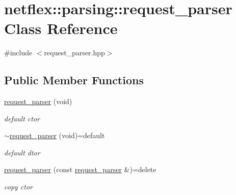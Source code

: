 \hypertarget{classnetflex_1_1parsing_1_1request__parser}{}\section{netflex\+:\+:parsing\+:\+:request\+\_\+parser Class Reference}
\label{classnetflex_1_1parsing_1_1request__parser}


{\ttfamily \#include $<$request\+\_\+parser.\+hpp$>$}

\subsection*{Public Member Functions}
\begin{DoxyCompactItemize}
\item 
\mbox{\label{classnetflex_1_1parsing_1_1request__parser_a7ab3962c03f01b2be6459adec8d502be}} 
\hyperlink{classnetflex_1_1parsing_1_1request__parser_a7ab3962c03f01b2be6459adec8d502be}{request\+\_\+parser} (void)
\begin{DoxyCompactList}\small\item\em default ctor \end{DoxyCompactList}\item 
\mbox{\label{classnetflex_1_1parsing_1_1request__parser_a69f8693a6fe481f2e3ec5eedf529fdfd}} 
\hyperlink{classnetflex_1_1parsing_1_1request__parser_a69f8693a6fe481f2e3ec5eedf529fdfd}{$\sim$request\+\_\+parser} (void)=default
\begin{DoxyCompactList}\small\item\em default dtor \end{DoxyCompactList}\item 
\mbox{\label{classnetflex_1_1parsing_1_1request__parser_aa47a7676d5e2da63d2d0e5be9bc3d483}} 
\hyperlink{classnetflex_1_1parsing_1_1request__parser_aa47a7676d5e2da63d2d0e5be9bc3d483}{request\+\_\+parser} (const \hyperlink{classnetflex_1_1parsing_1_1request__parser}{request\+\_\+parser} \&)=delete
\begin{DoxyCompactList}\small\item\em copy ctor \end{DoxyCompactList}\item 
\mbox{\label{classnetflex_1_1parsing_1_1request__parser_ae767b927e82531e4cd8b1581cf9c391b}} 

\end{DoxyCompactItemize}
